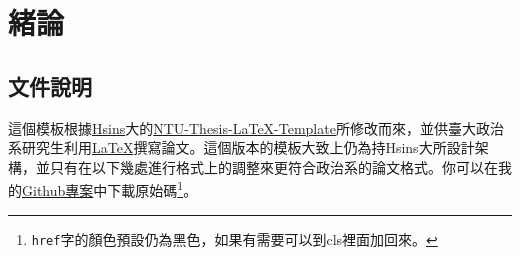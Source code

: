 
\chapter{緒論}

\section{文件說明}

這個模板根據\href{https://github.com/Hsins}{Hsins}大的\href{https://github.com/Hsins/NTU-Thesis-LaTeX-Template}{NTU-Thesis-LaTeX-Template}所修改而來，並供臺大政治系研究生利用\href{https://www.latex-project.org}{\LaTeX}撰寫論文。這個版本的模板大致上仍為持Hsins大所設計架構，並只有在以下幾處進行格式上的調整來更符合政治系的論文格式。你可以在我的\href{https://github.com/withworksc/NTUPS_Thesis_Template}{Github專案}中下載原始碼\footnote{\texttt{href}字的顏色預設仍為黑色，如果有需要可以到cls裡面加回來。}。